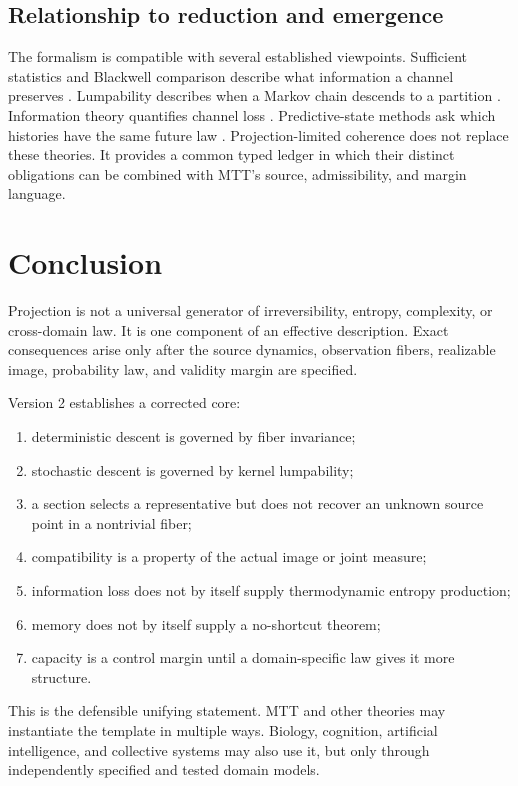 \documentclass[11pt]{article}
\begin{document}
\subsection{Relationship to reduction and emergence}

The formalism is compatible with several established viewpoints.
Sufficient statistics and Blackwell comparison describe what information a
channel preserves \cite{blackwell1953}.  Lumpability describes when a
Markov chain descends to a partition \cite{kemeny_snell,norris}.
Information theory quantifies channel loss \cite{cover_thomas}.
Predictive-state methods ask which histories have the same future law
\cite{crutchfield_young,shalizi_crutchfield}.  Projection-limited coherence
does not replace these theories.  It provides a common typed ledger in which
their distinct obligations can be combined with MTT's source, admissibility,
and margin language.

\section{Conclusion}

Projection is not a universal generator of irreversibility, entropy,
complexity, or cross-domain law.  It is one component of an effective
description.  Exact consequences arise only after the source dynamics,
observation fibers, realizable image, probability law, and validity margin
are specified.

Version 2 establishes a corrected core:
\begin{enumerate}
\item deterministic descent is governed by fiber invariance;
\item stochastic descent is governed by kernel lumpability;
\item a section selects a representative but does not recover an unknown
source point in a nontrivial fiber;
\item compatibility is a property of the actual image or joint measure;
\item information loss does not by itself supply thermodynamic entropy
production;
\item memory does not by itself supply a no-shortcut theorem;
\item capacity is a control margin until a domain-specific law gives it
more structure.
\end{enumerate}

This is the defensible unifying statement.  MTT and other theories may
instantiate the template in multiple ways.  Biology, cognition, artificial
intelligence, and collective systems may also use it, but only through
independently specified and tested domain models.



\end{document}
